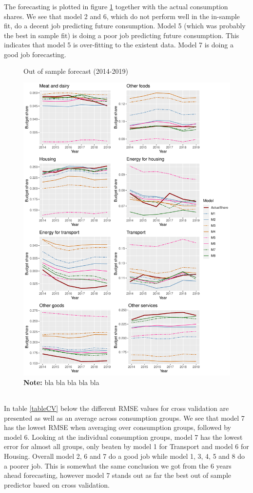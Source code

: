 The forecasting is plotted in figure \ref{forecast_fig} together with the actual consumption shares. We see that model 2 and 6, which do not perform well in the in-sample fit, do a decent job predicting future consumption. Model 5 (which was probably the best in sample fit) is doing a poor job predicting future consumption. This indicates that model 5 is over-fitting to the existent data. Model 7 is doing a good job forecasting.
\begin{figure}[H]
\centering
\caption{Out of sample forecast (2014-2019)}
\label{forecast_fig}
\includegraphics[width=.8\textwidth]{Figures/wforecast_ny.pdf}
\captionsetup{singlelinecheck=off,size=scriptsize}
\setlength{\captionmargin}{10pt}
\caption*{
\textbf{Note:} bla bla bla bla bla}
\end{figure}
\\
In table \ref{tableCV} below the different RMSE values for cross validation are presented as well as an average across consumption groups. We see that model 7 has the lowest RMSE when averaging over consumption groups, followed by model 6. Looking at the individual consumption groups, model 7 has the lowest error for almost all groups, only beaten by model 1 for Transport and model 6 for Housing. Overall model 2, 6 and 7 do a good job while model 1, 3, 4, 5 and 8 do a poorer job. This is somewhat the same conclusion we got from the 6 years ahead forecasting, however model 7 stands out as far the best out of sample predictor based on cross validation. 


